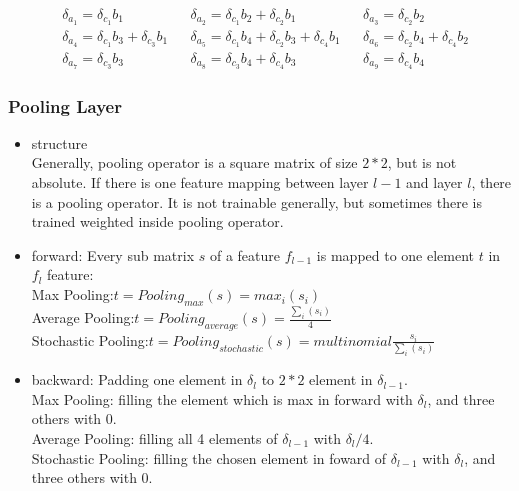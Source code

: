 \begin{frame}
\begin{itemize}
			\begin{equation*}
					\begin{aligned}
						  &\delta_{a_1}=\delta_{c_1}b_1  
						  &&\delta_{a_2}=\delta_{c_1}b_2+\delta_{c_2}b_1 
						  &&\delta_{a_3}=\delta_{c_2}b_2  
					   \\ &\delta_{a_4}=\delta_{c_1}b_3+\delta_{c_3}b_1 
						  &&\delta_{a_5}=\delta_{c_1}b_4+\delta_{c_2}b_3+\delta_{c_4}b_1 
						  &&\delta_{a_6}=\delta_{c_2}b_4+\delta_{c_4}b_2 
					   \\ &\delta_{a_7}=\delta_{c_3}b_3
						  &&\delta_{a_8}=\delta_{c_3}b_4+\delta_{c_4}b_3
						  &&\delta_{a_9}=\delta_{c_4}b_4
					\end{aligned}
			\end{equation*}
	\end{itemize}
\end{frame}
\begin{frame}
\frametitle{Pooling Layer}
	\scriptsize
	\begin{itemize}
		\item structure
			\\Generally, pooling operator is a square matrix of size $2*2$, but is not absolute. If there is one feature mapping between layer $l-1$ and layer $l$, there is a pooling operator. It is not trainable generally, but sometimes there is trained weighted inside pooling operator.
		\item forward: Every sub matrix $s$ of a feature $f_{l-1}$ is mapped to one element $t$ in $f_{l}$ feature:
			\\\hspace{0.5cm} Max Pooling:$t=Pooling_{max}(s)=max_i(s_i)$
			\\\hspace{0.5cm} Average Pooling:$t=Pooling_{average}(s)=\frac{\sum_i(s_i)}{4}$
			\\\hspace{0.5cm} Stochastic Pooling:$t=Pooling_{stochastic}(s)=multinomial\frac{s_i}{\sum_i(s_i)}$
		\item backward: Padding one element in $\delta_l$ to $2*2$ element in $\delta_{l-1}$.
			\\\hspace{0.5cm} Max Pooling: filling the element which is max in forward with $\delta_l$, and three others with 0.
			\\\hspace{0.5cm} Average Pooling: filling all 4 elements of $\delta_{l-1}$ with $\delta_l/4$.
			\\\hspace{0.5cm} Stochastic Pooling: filling the chosen element in foward of $\delta_{l-1}$ with $\delta_l$, and three others with 0.
	\end{itemize}
\end{frame}
